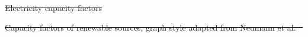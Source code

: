 \documentclass[5p,numafflabel]{elsarticle}
\providecommand{\DIFdeltex}[1]{{\protect\color{red}\sout{#1}}}                      %
\providecommand{\DIFdelFL}[1]{\DIFdel{#1}} %
\providecommand{\DIFdel}[1]{\texorpdfstring{\DIFdeltex{#1}}{}} %
\begin{document}
{%
\DIFdelFL{Electricity capacity factors}}

{%
\DIFdelFL{Capacity factors of renewable sources, graph style adapted from Neumann et al. \mbox{%
\cite{Neumann2022}}\hspace{0pt}%
}}
\end{document}
